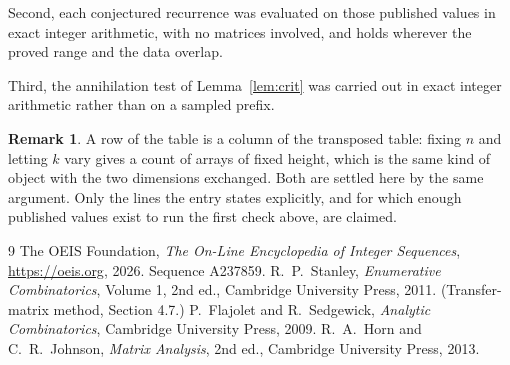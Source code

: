 \documentclass[11pt,a4paper]{article}
\theoremstyle{plain}
\theoremstyle{definition}
\newtheorem{remark}[theorem]{Remark}
\begin{document}
Second, each conjectured recurrence was evaluated on those published values in exact
integer arithmetic, with no matrices involved, and holds wherever the proved range and the
data overlap.

Third, the annihilation test of Lemma~\ref{lem:crit} was carried out in exact integer
arithmetic rather than on a sampled prefix.

\begin{remark}
A row of the table is a column of the transposed table: fixing $n$ and letting $k$ vary gives a
count of arrays of fixed height, which is the same kind of object with the two dimensions
exchanged. Both are settled here by the same argument. Only the lines the entry states
explicitly, and for which enough published values exist to run the first check above, are
claimed.
\end{remark}

\begin{thebibliography}{9}
 The OEIS Foundation, \emph{The On-Line Encyclopedia of Integer
Sequences}, \url{https://oeis.org}, 2026. Sequence A237859.
 R.~P.~Stanley, \emph{Enumerative Combinatorics}, Volume 1, 2nd ed.,
Cambridge University Press, 2011. (Transfer-matrix method, Section 4.7.)
 P.~Flajolet and R.~Sedgewick, \emph{Analytic Combinatorics}, Cambridge
University Press, 2009.
 R.~A.~Horn and C.~R.~Johnson, \emph{Matrix Analysis}, 2nd ed., Cambridge
University Press, 2013.
\end{thebibliography}
\end{document}
